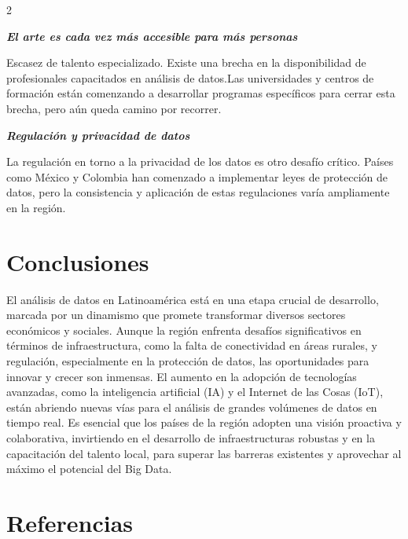 \documentclass[12pt,spanish,Letterpaper,openany]{book}
\begin{document}
\begin {multicols}{2}
\begin {flushleft}
\begin{minipage}[c]{\columnwidth}
\end{minipage}
\end {flushleft}

\emph{\textbf{El arte es cada vez más accesible para más personas}}

Escasez de talento especializado. Existe una brecha en la disponibilidad de profesionales capacitados en análisis de datos.Las universidades y centros de formación están comenzando a desarrollar programas específicos para cerrar esta brecha, pero aún queda camino por recorrer.

\emph{\textbf{Regulación y privacidad de datos}}

La regulación en torno a la privacidad de los datos es otro desafío crítico. Países como México y Colombia han comenzado a implementar leyes de protección de datos, pero la consistencia y aplicación de estas regulaciones varía ampliamente en la región.

\hypertarget{conclusiones-11}{%
\section{Conclusiones}\label{conclusiones-11}}

El análisis de datos en Latinoamérica está en una etapa crucial de desarrollo, marcada por un dinamismo que promete transformar diversos sectores económicos y sociales. Aunque la región enfrenta desafíos significativos en términos de infraestructura, como la falta de conectividad en áreas rurales, y regulación, especialmente en la protección de datos, las oportunidades para innovar y crecer son inmensas. El aumento en la adopción de tecnologías avanzadas, como la inteligencia artificial (IA) y el Internet de las Cosas (IoT), están abriendo nuevas vías para el análisis de grandes volúmenes de datos en tiempo real. Es esencial que los países de la región adopten una visión proactiva y colaborativa, invirtiendo en el desarrollo de infraestructuras robustas y en la capacitación del talento local, para superar las barreras existentes y aprovechar al máximo el potencial del Big Data.

\hypertarget{referencias-10}{%
\section{Referencias}\label{referencias-10}}


\end{multicols}
\end{document}
